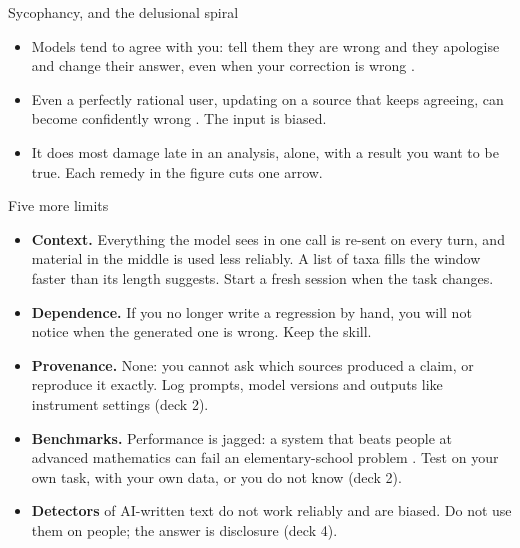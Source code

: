 \documentclass[11pt,aspectratio=169]{beamer}
\begin{document}
\begin{frame}{Sycophancy, and the delusional spiral}
  \small
  \begin{itemize}
    \item Models tend to agree with you: tell them they are wrong and they
      apologise and change their answer, even when your correction is wrong
      \parencite{sharma2024sycophancy}.
    \item Even a perfectly rational user, updating on a source that keeps
      agreeing, can become confidently wrong \parencite{chandra2026spiraling}.
      The input is biased.
    \item It does most damage late in an analysis, alone, with a result you
      want to be true. Each remedy in the figure cuts one arrow.
  \end{itemize}
\end{frame}

\begin{frame}{Five more limits}
  \small
  \begin{itemize}
    \item \textbf{Context.} Everything the model sees in one call is re-sent
      on every turn, and material in the middle is used less reliably. A list
      of taxa fills the window faster than its length suggests. Start a fresh
      session when the task changes.
    \item \textbf{Dependence.} If you no longer write a regression by hand,
      you will not notice when the generated one is wrong. Keep the skill.
    \item \textbf{Provenance.} None: you cannot ask which sources produced a
      claim, or reproduce it exactly. Log prompts, model versions and outputs
      like instrument settings (deck 2).
    \item \textbf{Benchmarks.} Performance is jagged: a system that beats
      people at advanced mathematics can fail an elementary-school problem
      \parencite{mitchell2026jagged}. Test on your own task, with your own
      data, or you do not know (deck 2).
    \item \textbf{Detectors} of AI-written text do not work reliably and are
      biased. Do not use them on people; the answer is disclosure (deck 4).
  \end{itemize}
\end{frame}

\end{document}
